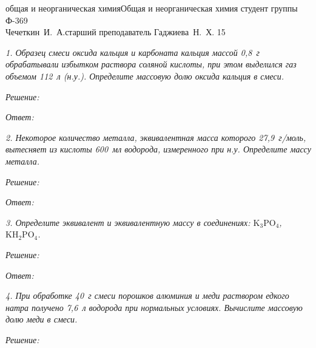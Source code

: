 






{общая и неорганическая химия}{Общая и неорганическая химия}
{студент группы Ф-369\\Чечеткин~И.~А.}{старший преподаватель Гаджиева~Н.~Х.}
{\!\!}{15}


\emph{1. Образец смеси оксида кальция и карбоната кальция массой 0,8~г
обрабатывали избытком раствора соляной кислоты, при этом выделился газ объемом
112~л (н.у.). Определите массовую долю оксида кальция в смеси.}

\vspace*{2em}
\emph{Решение:}

\vspace*{2em}
\emph{Ответ: }

\newpage %

\emph{2. Некоторое количество металла, эквивалентная масса которого
27,9~г/моль, вытесняет из кислоты 600~мл водорода, измеренного при н.у.
Определите массу металла.}

\vspace*{2em}
\emph{Решение:}

\vspace*{2em}
\emph{Ответ: }

\newpage %

\emph{3. Определите эквивалент и эквивалентную массу в соединениях:
\( \mathrm{K_3PO_4} \), \( \mathrm{KH_2PO_4} \).}

\vspace*{2em}
\emph{Решение:}

\vspace*{2em}
\emph{Ответ: }

\newpage %

\emph{4. При обработке 40~г смеси порошков алюминия и меди раствором едкого
натра получено 7,6~л водорода при нормальных условиях. Вычислите массовую долю
меди в смеси.}

\vspace*{2em}
\emph{Решение:}

